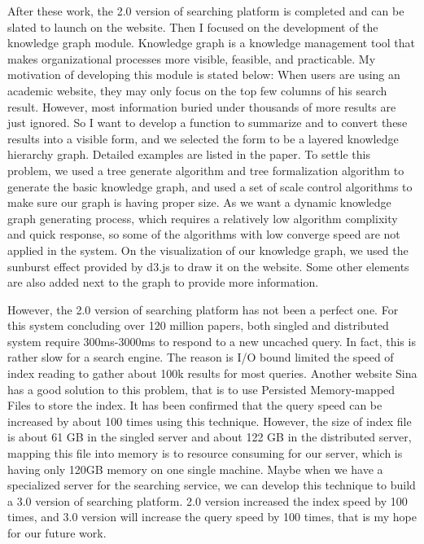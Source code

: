 \begin{bigabstract}
After these work, the 2.0 version of searching platform is completed and can be slated to launch on the website. Then I focused on the development of the knowledge graph module. Knowledge graph is a knowledge management tool that makes organizational processes more visible, feasible, and practicable. My motivation of developing this module is stated below: When users are using an academic website, they may only focus on the top few columns of his search result. However, most information buried under thousands of more results are just ignored. So I want to develop a function to summarize and to convert these results into a visible form, and we selected the form to be a layered knowledge hierarchy graph. Detailed examples are listed in the paper. To settle this problem, we used a tree generate algorithm and tree formalization algorithm to generate the basic knowledge graph, and used a set of scale control algorithms to make sure our graph is having proper size. As we want a dynamic knowledge graph generating process, which requires a relatively low algorithm complixity and quick response, so some of the algorithms with low converge speed are not applied in the system. On the visualization of our knowledge graph, we used the sunburst effect provided by d3.js to draw it on the website. Some other elements are also added next to the graph to provide more information.

However, the 2.0 version of searching platform has not been a perfect one. For this system concluding over 120 million papers, both singled and distributed system require 300ms-3000ms to respond to a new uncached query. In fact, this is rather slow for a search engine. The reason is I/O bound limited the speed of index reading to gather about 100k results for most queries. Another website Sina has a good solution to this problem, that is to use Persisted Memory-mapped Files to store the index. It has been confirmed that the query speed can be increased by about 100 times using this technique. However, the size of index file is about 61 GB in the singled server and about 122 GB in the distributed server, mapping this file into memory is to resource consuming for our server, which is having only 120GB memory on one single machine. Maybe when we have a specialized server for the searching service, we can develop this technique to build a 3.0 version of searching platform. 2.0 version increased the index speed by 100 times, and 3.0 version will increase the query speed by 100 times, that is my hope for our future work.


\end{bigabstract}